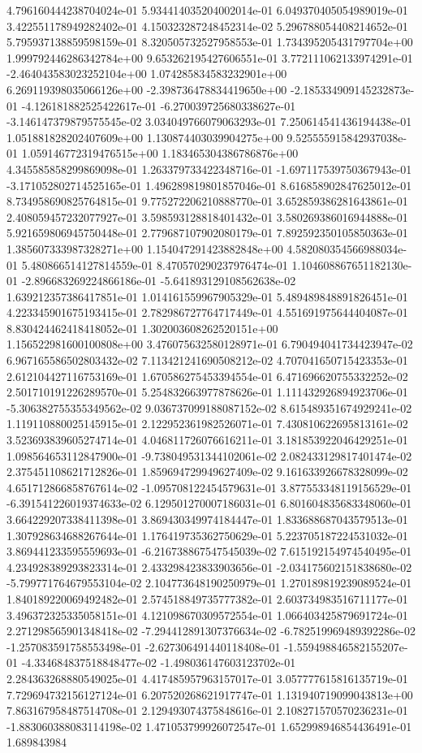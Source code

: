 4.796160444238704024e-01	5.934414035204002014e-01	6.049370405054989019e-01	3.422551178949282402e-01	4.150323287248452314e-02	5.296788054408214652e-01	5.795937138859598159e-01	8.320505732527958553e-01	1.734395205431797704e+00	1.999792446286342784e+00	9.653262195427606551e-01	3.772111062133974291e-01	-2.464043583023252104e+00	1.074285834583232901e+00	6.269119398035066126e+00	-2.398736478834419650e+00	-2.185334909145232873e-01	-4.126181882525422617e-01	-6.270039725680338627e-01	-3.146147379879575545e-02	3.034049766079063293e-01	7.250614541436194438e-01	1.051881828202407609e+00	1.130874403039904275e+00	9.525555915842937038e-01	1.059146772319476515e+00	1.183465304386786876e+00	4.345585858299869098e-01	1.263379733422348716e-01	-1.697117539750367943e-01	-3.171052802714525165e-01	1.496289819801857046e-01	8.616858902847625012e-01	8.734958690825764815e-01	9.775272206210888770e-01	3.652859386281643861e-01	2.408059457232077927e-01	3.598593128818401432e-01	3.580269386016944888e-01	5.921659806945750448e-01	2.779687107902080179e-01	7.892592350105850363e-01	1.385607333987328271e+00	1.154047291423882848e+00	4.582080354566988034e-01	5.480866514127814559e-01	8.470570290237976474e-01	1.104608867651182130e-01	-2.896683269224866186e-01	-5.641893129108562638e-02	1.639212357386417851e-01	1.014161559967905329e-01	5.489489848891826451e-01	4.223345901675193415e-01	2.782986727764717449e-01	4.551691975644404087e-01	8.830424462418418052e-01	1.302003608262520151e+00	1.156522981600100808e+00	3.476075632580128971e-01	6.790494041734423947e-02	6.967165586502803432e-02	7.113421241690508212e-02	4.707041650715423353e-01	2.612104427116753169e-01	1.670586275453394554e-01	6.471696620755332252e-02	2.501710191226289570e-01	5.254832663977878626e-01	1.111432926894923706e-01	-5.306382755355349562e-02	9.036737099188087152e-02	8.615489351674929241e-02	1.119110880025145915e-01	2.122952361982526071e-01	7.430810622695813161e-02	3.523693839605274714e-01	4.046811726076616211e-01	3.181853922046429251e-01	1.098564653112847900e-01	-9.738049531344102061e-02	2.082433129817401474e-02	2.375451108621712826e-01	1.859694729949627409e-02	9.161633926678328099e-02	4.651712866858767614e-02	-1.095708122454579631e-01	3.877553348119156529e-01	-6.391541226019374633e-02	6.129501270007186031e-01	6.801604835683348060e-01	3.664229207338411398e-01	3.869430349974184447e-01	1.833688687043579513e-01	1.307928634688267644e-01	1.176419735362750629e-01	5.223705187224531032e-01	3.869441233595559693e-01	-6.216738867547545039e-02	7.615192154974540495e-01	4.234928389293823314e-01	2.433298423833903656e-01	-2.034175602151838680e-02	-5.799771764679553104e-02	2.104773648190250979e-01	1.270189819239089524e-01	1.840189220069492482e-01	2.574518849735777382e-01	2.603734983516711177e-01	3.496372325335058151e-01	4.121098670309572554e-01	1.066403425879691724e-01	2.271298565901348418e-02	-7.294412891307376634e-02	-6.782519969489392286e-02	-1.257083591758553498e-01	-2.627306491440118408e-01	-1.559498846582155207e-01	-4.334684837518848477e-02	-1.498036147603123702e-01	2.284363268880549025e-01	4.417485957963157017e-01	3.057777615816135719e-01	7.729694732156127124e-01	6.207520268621917747e-01	1.131940719099043813e+00	7.863167958487514708e-01	2.129493074375848616e-01	2.108271570570236231e-01	-1.883060388083114198e-02	1.471053799926072547e-01	1.652998946854436491e-01	1.689843984